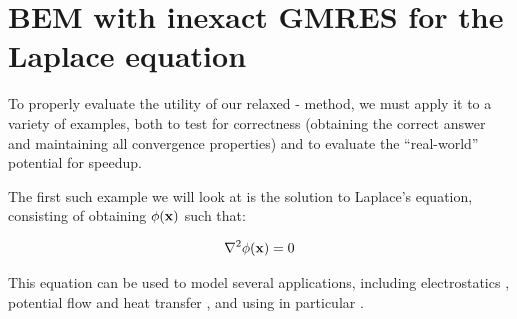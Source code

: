 
\chapter{BEM with inexact GMRES for the Laplace equation}
\label{chapter:laplace_bem}
\thispagestyle{myheadings}

\graphicspath{{Laplace/}}

To properly evaluate the utility of our relaxed {\fmm}-{\bem} method, we must apply it to a variety of examples, both to test for correctness (obtaining the correct answer and maintaining all convergence properties) and to evaluate the ``real-world'' potential for speedup.


The first such example we will look at is the solution to Laplace's equation, consisting of obtaining $\phi(\mathbf{x})$ such that:

\begin{equation}\label{eqn:laplace}
	\nabla^{2}\phi(\vect{x}) = 0
\end{equation}

This equation can be used to model several applications, including electrostatics \cite{YokotaETal2010}, potential flow \cite{klaseboeretal2011} and heat transfer \cite{panti2008,majchrzakfreus2003}, and using {\fmmbem} in particular \cite{Nabors94}.

%
%
%
%

